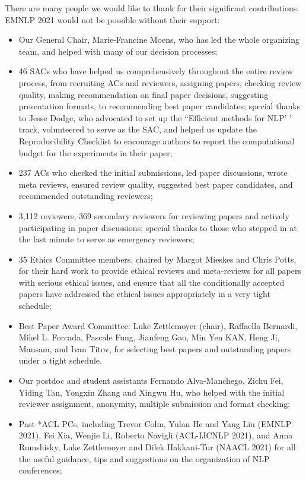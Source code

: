 There are many people we would like to thank for their significant contributions. EMNLP 2021 would not be possible without their support:

\begin{itemize}

 \item Our General Chair, Marie-Francine Moens, who has led the whole organizing team, and helped with many of our decision processes;
\item 46 SACs who have helped us comprehensively throughout the entire review process, from recruiting ACs and reviewers, assigning papers, checking review quality, making recommendation on final paper decisions, suggesting presentation formats, to recommending best paper candidates; special thanks to Jesse Dodge, who advocated to set up the ``Efficient methods for NLP' '  track, volunteered to serve as the SAC, and helped us update the Reproducibility Checklist to encourage authors to report the computational budget for the experiments in their paper;
\item 237 ACs who checked the initial submissions, led paper discussions, wrote meta reviews, ensured review quality, suggested best paper candidates, and recommended outstanding reviewers;
\item 3,112 reviewers, 369 secondary reviewers for reviewing papers and actively participating in paper discussions; special thanks to those who stepped in at the last minute to serve as emergency reviewers;
\item 35 Ethics Committee members, chaired by Margot Mieskes and Chris Potts, for their hard work to provide ethical reviews and meta-reviews for all papers with serious ethical issues, and ensure that all the conditionally accepted papers have addressed the ethical issues appropriately in a very tight schedule;
\item Best Paper Award Committee: Luke Zettlemoyer (chair), Raffaella Bernardi, Mikel L. Forcada, Pascale Fung, Jianfeng Gao, Min Yen KAN, Heng Ji, Mausam, and Ivan Titov, for selecting best papers and outstanding papers under a tight schedule.
\item Our postdoc and student assistants Fernando Alva-Manchego, Zichu Fei, Yiding Tan, Yongxin Zhang and Xingwu Hu, who helped with the initial reviewer assignment, anonymity, multiple submission and format checking;
\item Past *ACL PCs, including Trevor Cohn, Yulan He and Yang Liu (EMNLP 2021), Fei Xia, Wenjie Li, Roberto Navigli (ACL-IJCNLP 2021), and  Anna Rumshisky, Luke Zettlemoyer and Dilek Hakkani-Tur (NAACL 2021) for all the useful guidance, tips and suggestions on the organization of NLP conferences;

\end{itemize}
